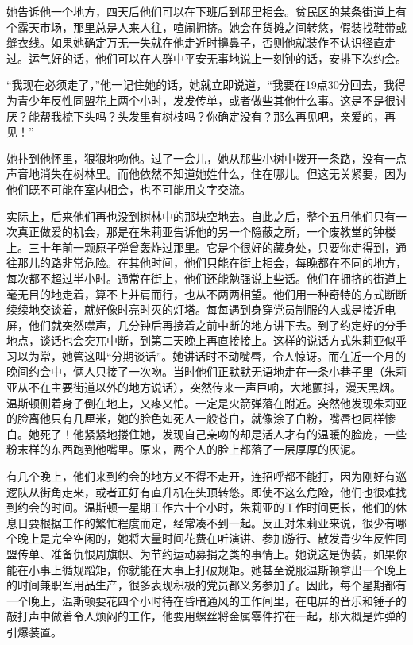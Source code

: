 她告诉他一个地方，四天后他们可以在下班后到那里相会。贫民区的某条街道上有个露天市场，那里总是人来人往，喧闹拥挤。她会在货摊之间转悠，假装找鞋带或缝衣线。如果她确定万无一失就在他走近时擤鼻子，否则他就装作不认识径直走过。运气好的话，他们可以在人群中平安无事地说上一刻钟的话，安排下次约会。

``我现在必须走了，''他一记住她的话，她就立即说道，``我要在19点30分回去，我得为青少年反性同盟花上两个小时，发发传单，或者做些其他什么事。这是不是很讨厌？能帮我梳下头吗？头发里有树枝吗？你确定没有？那么再见吧，亲爱的，再见！''

她扑到他怀里，狠狠地吻他。过了一会儿，她从那些小树中拨开一条路，没有一点声音地消失在树林里。而他依然不知道她姓什么，住在哪儿。但这无关紧要，因为他们既不可能在室内相会，也不可能用文字交流。

实际上，后来他们再也没到树林中的那块空地去。自此之后，整个五月他们只有一次真正做爱的机会，那是在朱莉亚告诉他的另一个隐蔽之所，一个废教堂的钟楼上。三十年前一颗原子弹曾轰炸过那里。它是个很好的藏身处，只要你走得到，通往那儿的路非常危险。在其他时间，他们只能在街上相会，每晚都在不同的地方，每次都不超过半小时。通常在街上，他们还能勉强说上些话。他们在拥挤的街道上毫无目的地走着，算不上并肩而行，也从不两两相望。他们用一种奇特的方式断断续续地交谈着，就好像时亮时灭的灯塔。每每遇到身穿党员制服的人或是接近电屏，他们就突然噤声，几分钟后再接着之前中断的地方讲下去。到了约定好的分手地点，谈话也会突兀中断，到第二天晚上再直接接上。这样的说话方式朱莉亚似乎习以为常，她管这叫``分期谈话''。她讲话时不动嘴唇，令人惊讶。而在近一个月的晚间约会中，俩人只接了一次吻。当时他们正默默无语地走在一条小巷子里（朱莉亚从不在主要街道以外的地方说话），突然传来一声巨响，大地颤抖，漫天黑烟。温斯顿侧着身子倒在地上，又疼又怕。一定是火箭弹落在附近。突然他发现朱莉亚的脸离他只有几厘米，她的脸色如死人一般苍白，就像涂了白粉，嘴唇也同样惨白。她死了！他紧紧地搂住她，发现自己亲吻的却是活人才有的温暖的脸庞，一些粉末样的东西跑到他嘴里。原来，两个人的脸上都落了一层厚厚的灰泥。

有几个晚上，他们来到约会的地方又不得不走开，连招呼都不能打，因为刚好有巡逻队从街角走来，或者正好有直升机在头顶转悠。即使不这么危险，他们也很难找到约会的时间。温斯顿一星期工作六十个小时，朱莉亚的工作时间更长，他们的休息日要根据工作的繁忙程度而定，经常凑不到一起。反正对朱莉亚来说，很少有哪个晚上是完全空闲的，她将大量时间花费在听演讲、参加游行、散发青少年反性同盟传单、准备仇恨周旗帜、为节约运动募捐之类的事情上。她说这是伪装，如果你能在小事上循规蹈矩，你就能在大事上打破规矩。她甚至说服温斯顿拿出一个晚上的时间兼职军用品生产，很多表现积极的党员都义务参加了。因此，每个星期都有一个晚上，温斯顿要花四个小时待在昏暗通风的工作间里，在电屏的音乐和锤子的敲打声中做着令人烦闷的工作，他要用螺丝将金属零件拧在一起，那大概是炸弹的引爆装置。

